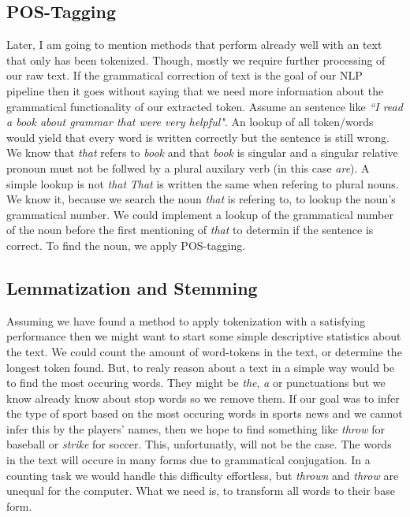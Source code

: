 \subsection{POS-Tagging}
Later, I am going to mention methods that perform already well with an text that only has been tokenized. Though, mostly we require further processing of our raw text. If the grammatical correction of text is the goal of our NLP pipeline then it goes without saying that we need more information about the grammatical functionality of our extracted token. Assume an sentence like \textit{``I read a book about grammar that were very helpful"}. An lookup of all token/words would yield that every word is written correctly but the sentence is still wrong. We know that \textit{that} refers to \textit{book} and that \textit{book} is singular and a singular relative pronoun must not be follwed by a plural auxilary verb (in this case \textit{are}). A simple lookup is not \textit{that} \textit{That} is written the same when refering to plural nouns. We know it, because we search the noun \textit{that} is refering to, to lookup the noun's grammatical number. We could implement a lookup of the grammatical number of the noun before the first mentioning of \textit{that} to determin if the sentence is correct. To find the noun, we apply POS-tagging.

\subsection{Lemmatization and Stemming}
Assuming we have found a method to apply tokenization with a satisfying performance then we might want to start some simple descriptive statistics about the text. We could count the amount of word-tokens in the text, or determine the longest token found. But, to realy reason about a text in a simple way would be to find the most occuring words. They might be \textit{the}, \textit{a} or punctuations but we know already know about stop words so we remove them. If our goal was to infer the type of sport based on the most occuring words in sports news and we cannot infer this by the players' names, then we hope to find something like \textit{throw} for baseball or \textit{strike} for soccer. This, unfortunatly, will not be the case. The words in the text will occure in many forms due to grammatical conjugation. In a counting task we would handle this difficulty effortless, but \textit{thrown} and \textit{throw} are unequal for the computer. What we need is, to transform all words to their base form.

